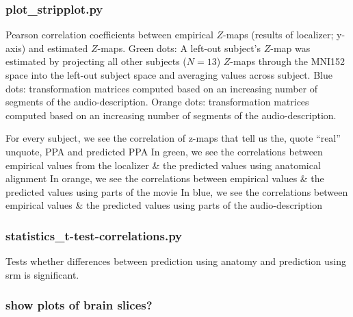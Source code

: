 \subsubsection{plot\_stripplot.py}

%
Pearson correlation coefficients between empirical $Z$-maps (results of
localizer; y-axis) and estimated $Z$-maps.
%
Green dots: A left-out subject's $Z$-map was estimated by projecting all other
subjects ($N = 13$) $Z$-maps through the MNI152 space into the left-out subject
space and averaging values across subject.
%
Blue dots: transformation matrices computed based on an increasing number of
segments of the audio-description.
%
Orange dots: transformation matrices computed based on an increasing number of
segments of the audio-description.


For every subject, we see the correlation of z-maps that tell us the, quote
``real'' unquote, PPA and predicted PPA
%
In green, we see the correlations between empirical values from the localizer \&
the predicted values using anatomical alignment
%
In orange, we see the correlations between empirical values \& the predicted
values using parts of the movie
%
In blue, we see the correlations between empirical values \& the predicted
values using parts of the audio-description


\subsubsection{statistics\_t-test-correlations.py}

Tests whether differences between prediction using anatomy and prediction using
\ac{srm} is significant.


\subsubsection{show plots of brain slices?}






